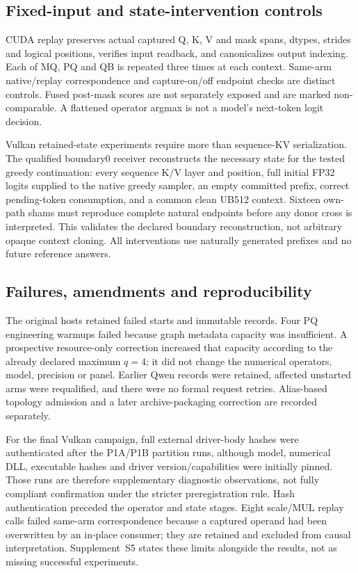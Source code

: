 \subsection{Fixed-input and state-intervention controls}
CUDA replay preserves actual captured Q, K, V and mask spans, dtypes, strides and logical positions, verifies input readback, and canonicalizes output indexing. Each of MQ, PQ and QB is repeated three times at each context. Same-arm native/replay correspondence and capture-on/off endpoint checks are distinct controls. Fused post-mask scores are not separately exposed and are marked non-comparable. A flattened operator argmax is not a model's next-token logit decision.

Vulkan retained-state experiments require more than sequence-KV serialization. The qualified boundary0 receiver reconstructs the necessary state for the tested greedy continuation: every sequence K/V layer and position, full initial FP32 logits supplied to the native greedy sampler, an empty committed prefix, correct pending-token consumption, and a common clean UB512 context. Sixteen own-path shams must reproduce complete natural endpoints before any donor cross is interpreted. This validates the declared boundary reconstruction, not arbitrary opaque context cloning. All interventions use naturally generated prefixes and no future reference answers.

\subsection{Failures, amendments and reproducibility}
The original hosts retained failed starts and immutable records. Four PQ engineering warmups failed because graph metadata capacity was insufficient. A prospective resource-only correction increased that capacity according to the already declared maximum $q=4$; it did not change the numerical operators, model, precision or panel. Earlier Qwen records were retained, affected unstarted arms were requalified, and there were no formal request retries. Alias-based topology admission and a later archive-packaging correction are recorded separately.

For the final Vulkan campaign, full external driver-body hashes were authenticated after the P1A/P1B partition runs, although model, numerical DLL, executable hashes and driver version/capabilities were initially pinned. Those runs are therefore supplementary diagnostic observations, not fully compliant confirmation under the stricter preregistration rule. Hash authentication preceded the operator and state stages. Eight scale/MUL replay calls failed same-arm correspondence because a captured operand had been overwritten by an in-place consumer; they are retained and excluded from causal interpretation. Supplement~S5 states these limits alongside the results, not as missing successful experiments.


